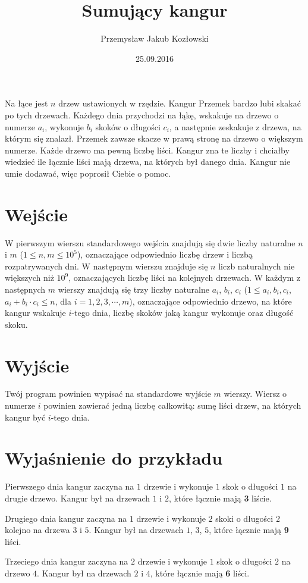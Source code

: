 \documentclass[zad,zawodnik,utf8]{sinol}
\title{Sumujący kangur}
\author{Przemysław Jakub Kozłowski} %
\date{25.09.2016}
\begin{document}
\begin{tasktext}%
Na łące jest $n$ drzew ustawionych w rzędzie. Kangur Przemek bardzo lubi skakać po tych drzewach.
Każdego dnia przychodzi na łąkę, wskakuje na drzewo o numerze $a_i$,
wykonuje $b_i$ skoków o długości $c_i$, a następnie zeskakuje z drzewa, na którym się znalazł.
Przemek zawsze skacze w prawą stronę na drzewo o większym numerze. Każde drzewo ma pewną liczbę liści.
Kangur zna te liczby i chciałby wiedzieć ile łącznie liści mają drzewa, na których był danego dnia.
Kangur nie umie dodawać, więc poprosił Ciebie o pomoc.

  \section{Wejście}
W pierwszym wierszu standardowego wejścia znajdują się dwie liczby naturalne $n$ i $m$ ($1 \leq n,m \leq 10^5$), 
oznaczające odpowiednio liczbę drzew i liczbą rozpatrywanych dni. W następnym wierszu znajduje się $n$ liczb naturalnych nie większych niż $10^9$, 
oznaczających liczbę liści na kolejnych drzewach. 
W każdym z następnych $m$ wierszy znajdują się trzy liczby naturalne
$a_i$, $b_i$, $c_i$ ($1 \leq a_i,b_i,c_i$, $a_i+b_i\cdot c_i \leq n$, dla $i=1,2,3,\cdots,m$),
oznaczające odpowiednio drzewo, na które kangur wskakuje $i$-tego dnia, liczbę skoków jaką kangur wykonuje oraz długość skoku.

  \section{Wyjście}
Twój program powinien wypisać na standardowe wyjście $m$ wierszy. Wiersz o numerze $i$ powinien zawierać jedną liczbę całkowitą: sumę liści drzew,
na których kangur być $i$-tego dnia.

\makecompactexample

  \section{Wyjaśnienie do przykładu}
Pierwszego dnia kangur zaczyna na $1$ drzewie i wykonuje $1$ skok o długości $1$ na drugie drzewo.
Kangur był na drzewach $1$ i $2$, które łącznie mają \textbf{3} liście.

Drugiego dnia kangur zaczyna na $1$ drzewie i wykonuje $2$ skoki o długości $2$ kolejno na drzewa $3$ i $5$. 
Kangur był na drzewach $1$, $3$, $5$, które łącznie mają \textbf{9} liści.

Trzeciego dnia kangur zaczyna na $2$ drzewie i wykonuje $1$ skok o długości $2$ na drzewo $4$. Kangur był na drzewach $2$ i $4$,
które łącznie mają \textbf{6} liści.

\end{tasktext}
\end{document}
